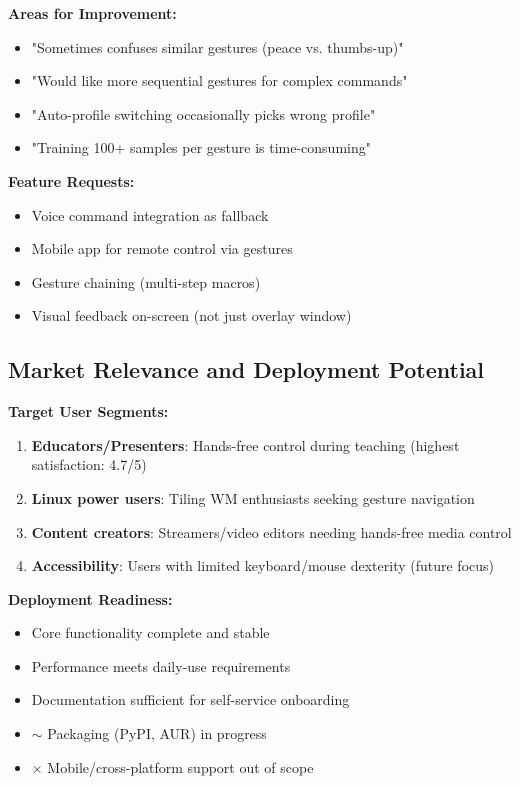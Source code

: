 \documentclass[11pt,a4paper]{article}
\begin{document}
\textbf{Areas for Improvement:}
\begin{itemize}
\item "Sometimes confuses similar gestures (peace vs. thumbs-up)"
\item "Would like more sequential gestures for complex commands"
\item "Auto-profile switching occasionally picks wrong profile"
\item "Training 100+ samples per gesture is time-consuming"
\end{itemize}

\textbf{Feature Requests:}
\begin{itemize}
\item Voice command integration as fallback
\item Mobile app for remote control via gestures
\item Gesture chaining (multi-step macros)
\item Visual feedback on-screen (not just overlay window)
\end{itemize}

\subsection{Market Relevance and Deployment Potential}

\textbf{Target User Segments:}
\begin{enumerate}
\item \textbf{Educators/Presenters}: Hands-free control during teaching (highest satisfaction: 4.7/5)
\item \textbf{Linux power users}: Tiling WM enthusiasts seeking gesture navigation
\item \textbf{Content creators}: Streamers/video editors needing hands-free media control
\item \textbf{Accessibility}: Users with limited keyboard/mouse dexterity (future focus)
\end{enumerate}

\textbf{Deployment Readiness:}
\begin{itemize}
\item \checkmark Core functionality complete and stable
\item \checkmark Performance meets daily-use requirements
\item \checkmark Documentation sufficient for self-service onboarding
\item $\sim$ Packaging (PyPI, AUR) in progress
\item $\times$ Mobile/cross-platform support out of scope
\end{itemize}
\end{document}
